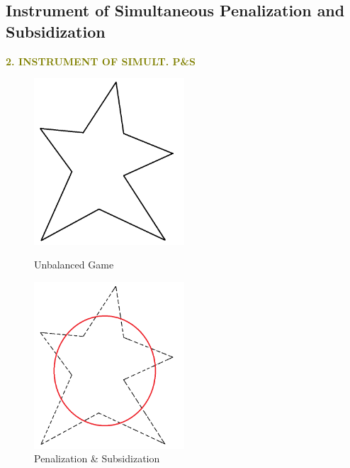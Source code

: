\documentclass[14pt]{beamer}
\begin{document}
\subsection{Instrument of Simultaneous Penalization and Subsidization}
\begin{frame}
\centering
\normalsize
\textcolor{olive}{\bf {\LARGE 2.} \bf {\LARGE I}NSTRUMENT OF {\bf {\LARGE S}}IMULT. {\bf {\LARGE P}}\&{\bf {\LARGE S}}}
\vspace{5mm}
\begin{figure}[H]
\centering
\begin{minipage}[t]{0.32\textwidth}
\centering
\includegraphics[width=0.5\textwidth]{conculsion1.png}
\caption*{Unbalanced Game}
\end{minipage}
\begin{minipage}[t]{0.32\textwidth}
\centering
\includegraphics[width=0.5\textwidth]{conculsion4.png}
\caption*{Penalization \& Subsidization}
\end{minipage}
\end{figure}
\vspace{-15mm}
\end{frame}
\end{document}
